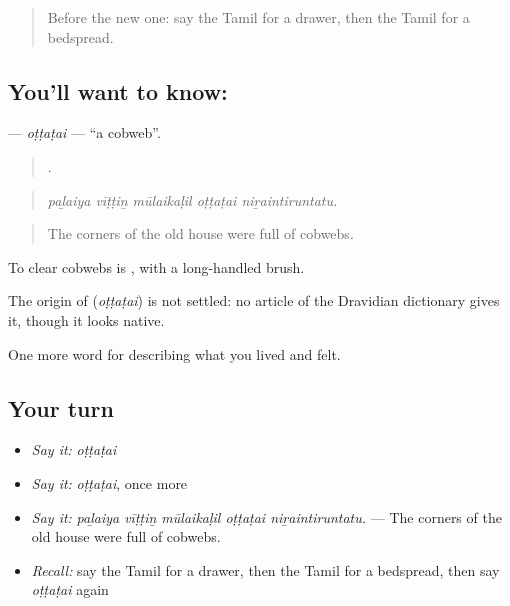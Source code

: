 \label{lesson:TA-C521-ottatai}



\begin{quote}
Before the new one: say the Tamil for a drawer, then the Tamil for a bedspread.
\end{quote}

\subsection*{You'll want to know: }
\textbf{} — \emph{oṭṭaṭai} — \textquotedblleft{}a cobweb\textquotedblright{}.

\begin{quote}
    .
\end{quote}

\begin{quote}
\emph{paḻaiya vīṭṭiṉ mūlaikaḷil oṭṭaṭai niṟaintiruntatu.}
\end{quote}

\begin{quote}
The corners of the old house were full of cobwebs.
\end{quote}

To clear cobwebs is  , with a long-handled brush.

\begin{cousinweb}
The origin of \textbf{} (\emph{oṭṭaṭai}) is not settled: no article of the Dravidian dictionary gives it, though it looks native.
\end{cousinweb}

\begin{grammarlens}[title={What you've built}]
One more word for describing what you lived and felt.
\end{grammarlens}

\subsection*{Your turn}
\begin{itemize}
\raggedright
  \item \emph{Say it:} \emph{oṭṭaṭai}
  \item \emph{Say it:} \emph{oṭṭaṭai}, once more
  \item \emph{Say it:} \emph{paḻaiya vīṭṭiṉ mūlaikaḷil oṭṭaṭai niṟaintiruntatu.} — The corners of the old house were full of cobwebs.
  \item \emph{Recall:} say the Tamil for a drawer, then the Tamil for a bedspread, then say \emph{oṭṭaṭai} again
\end{itemize}

